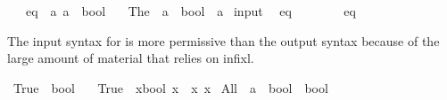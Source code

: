 \begin{isabellebody}
\ \ \ eq\ {\isacharcolon}{\kern0pt}{\isacharcolon}{\kern0pt}\ {\isachardoublequoteopen}{\isacharbrackleft}{\kern0pt}{\isacharprime}{\kern0pt}a{\isacharcomma}{\kern0pt}\ {\isacharprime}{\kern0pt}a{\isacharbrackright}{\kern0pt}\ {\isasymRightarrow}\ bool{\isachardoublequoteclose}\isanewline
\ \ \ The\ {\isacharcolon}{\kern0pt}{\isacharcolon}{\kern0pt}\ {\isachardoublequoteopen}{\isacharparenleft}{\kern0pt}{\isacharprime}{\kern0pt}a\ {\isasymRightarrow}\ bool{\isacharparenright}{\kern0pt}\ {\isasymRightarrow}\ {\isacharprime}{\kern0pt}a{\isachardoublequoteclose}\isanewline
\isanewline
{}\isamarkupfalse%
\ {\isacharparenleft}{\kern0pt}input{\isacharparenright}{\kern0pt}\isanewline
\ \ eq\ \ {\isacharparenleft}{\kern0pt}\ {\isachardoublequoteopen}{\isacharequal}{\kern0pt}{\isachardoublequoteclose}\ {}{}{\isacharparenright}{\kern0pt}\isanewline
{}\isamarkupfalse%
\ {\isacharparenleft}{\kern0pt}\isanewline
\ \ eq\ \ {\isacharparenleft}{\kern0pt}\ {\isachardoublequoteopen}{\isacharequal}{\kern0pt}{\isachardoublequoteclose}\ {}{}{\isacharparenright}{\kern0pt}%
\begin{isamarkuptext}%
The input syntax for  is more permissive than the output syntax
because of the large amount of material that relies on infixl.%
\end{isamarkuptext}\isamarkuptrue%
%
\isadelimdocument
%
\endisadelimdocument
%
\isatagdocument
%
\isamarkuptrue%
%
\endisatagdocument
{\isafolddocument}%
%
\isadelimdocument
%
\endisadelimdocument
{}\isamarkupfalse%
\ True\ {\isacharcolon}{\kern0pt}{\isacharcolon}{\kern0pt}\ bool\isanewline
\ \ \ {\isachardoublequoteopen}True\ {\isasymequiv}\ {\isacharparenleft}{\kern0pt}{\isacharparenleft}{\kern0pt}{\isasymlambda}x{\isacharcolon}{\kern0pt}{\isacharcolon}{\kern0pt}bool{\isachardot}{\kern0pt}\ x{\isacharparenright}{\kern0pt}\ {\isacharequal}{\kern0pt}\ {\isacharparenleft}{\kern0pt}{\isasymlambda}x{\isachardot}{\kern0pt}\ x{\isacharparenright}{\kern0pt}{\isacharparenright}{\kern0pt}{\isachardoublequoteclose}\isanewline
\isanewline
{}\isamarkupfalse%
\ All\ {\isacharcolon}{\kern0pt}{\isacharcolon}{\kern0pt}\ {\isachardoublequoteopen}{\isacharparenleft}{\kern0pt}{\isacharprime}{\kern0pt}a\ {\isasymRightarrow}\ bool{\isacharparenright}{\kern0pt}\ {\isasymRightarrow}\ bool{\isachardoublequoteclose}\ \ {\isacharparenleft}{\kern0pt}\ {\isachardoublequoteopen}{\isasymforall}{\isachardoublequoteclose}\ {}{}{\isacharparenright}{\kern0pt}\isanewline

\end{isabellebody}
